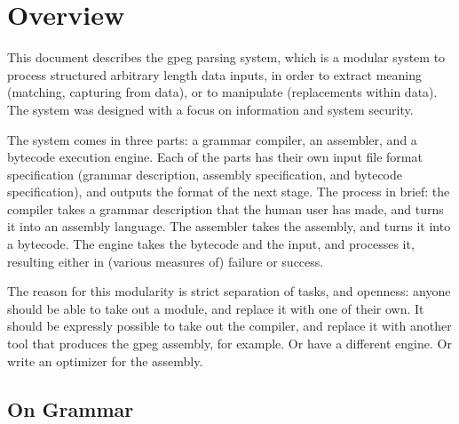\section{Overview}

This document describes the gpeg parsing system, which is a 
modular system to process structured arbitrary length data inputs,
in order to extract meaning (matching, capturing from data), or to
manipulate (replacements within data).
The system was designed with a focus on information and system security.

The system comes in three parts: a grammar compiler, an assembler,
and a bytecode execution engine. Each of the parts has their own
input file format specification (grammar description, assembly specification,
and bytecode specification), and outputs the format of the next stage.
The process in brief: the compiler takes a
grammar description that the human user has made, and turns it into
an assembly language. The assembler takes the assembly, and turns it
into a bytecode. The engine takes the bytecode and the input, and
processes it, resulting either in (various measures of) failure or
success.




The reason for this modularity is strict separation of tasks, and openness:
anyone should be able to take out a module, and replace it with one
of their own.
It should be expressly possible to take out the compiler, and replace
it with another tool that produces the gpeg assembly, for example.
Or have a different engine. Or write an optimizer for the assembly.

\subsection{On Grammar}
  
